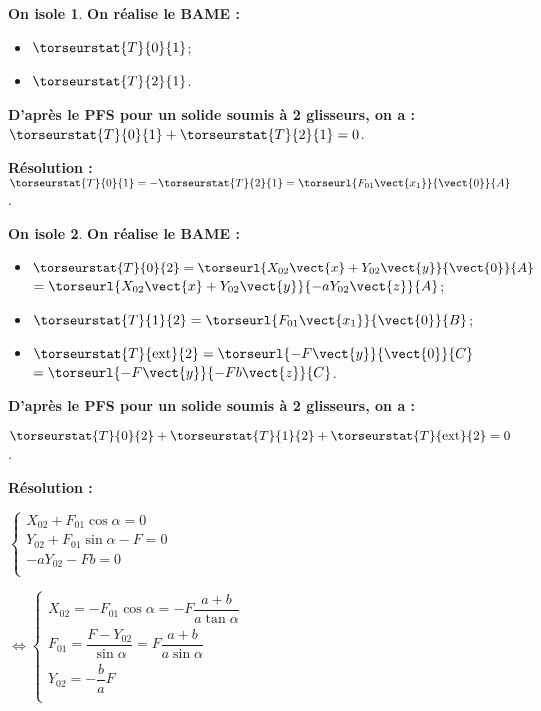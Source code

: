 \ifprof
\begin{corrige}

\textbf{On isole 1}.
\textbf{On réalise le BAME :}
\begin{itemize}
\item $\torseurstat{T}{0}{1}$;
\item $\torseurstat{T}{2}{1}$.
\end{itemize}
\textbf{D'après le PFS pour un solide soumis à 2 glisseurs, on a : }
$\torseurstat{T}{0}{1} + \torseurstat{T}{2}{1} = {0}$. 

\textbf{Résolution :} 
$ \torseurstat{T}{0}{1} = -\torseurstat{T}{2}{1}  = \torseurl{F_{01}\vect{x_1}}{\vect{0}}{A}$.

\end{corrige}

\begin{corrige}

\textbf{On isole 2}.
\textbf{On réalise le BAME :}
\begin{itemize}
\item $\torseurstat{T}{0}{2} =\torseurl{X_{02}\vect{x} +Y_{02}\vect{y}  }{\vect{0}}{A} $ $=\torseurl{X_{02}\vect{x} +Y_{02}\vect{y}  }{-aY_{02}\vect{z}}{A} $;
\item $\torseurstat{T}{1}{2} = \torseurl{F_{01}\vect{x_1}  }{\vect{0}}{B} $;
\item $\torseurstat{T}{\text{ext}}{2} = \torseurl{-F\vect{y}  }{\vect{0}}{C} $ $= \torseurl{-F\vect{y}  }{-Fb\vect{z}}{C}$.
\end{itemize}
\textbf{D'après le PFS pour un solide soumis à 2 glisseurs, on a : }

$\torseurstat{T}{0}{2} + \torseurstat{T}{1}{2}+\torseurstat{T}{\text{ext}}{2} = {0}$.

 \textbf{Résolution :}

$\left\{ \begin{array}{l}
X_{02}+F_{01}\cos\alpha  = 0 \\
Y_{02}+F_{01}\sin\alpha  -F= 0 \\
-aY_{02}-Fb  = 0 \\
\end{array}
\right.$


$
\Leftrightarrow 
\left\{ \begin{array}{l}
X_{02}=-F_{01}\cos\alpha  =-F\dfrac{a+b}{a\tan\alpha} \\
F_{01}  =\dfrac{F-Y_{02}}{\sin\alpha}=F\dfrac{a+b}{a\sin\alpha} \\
Y_{02} = -\dfrac{b}{a}F  \\
\end{array}
\right.$

\end{corrige}

